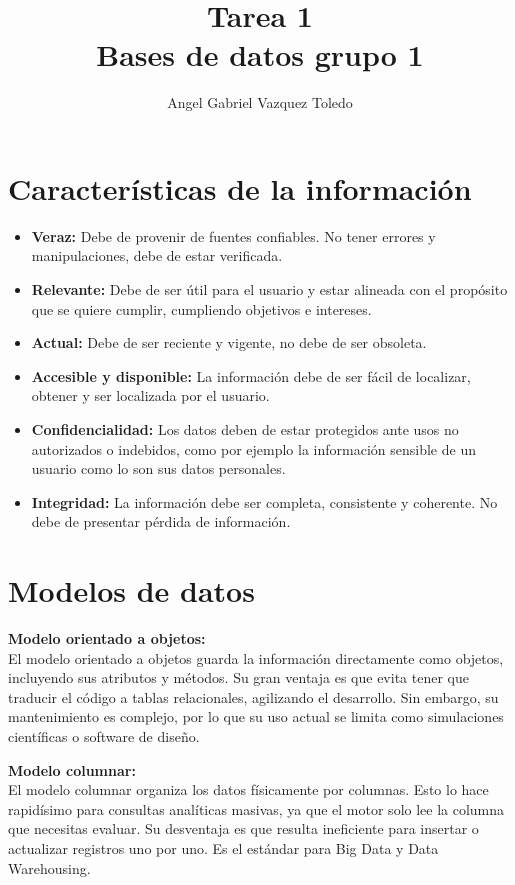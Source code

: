 \documentclass[12pt,a4paper]{article}
\title{\textbf{Tarea 1}\\ \large Bases de datos grupo 1}
\author{Angel Gabriel Vazquez Toledo}
\date{} %
\begin{document}
\maketitle

\section*{Características de la información}
\begin{itemize}
    \item \textbf{Veraz:} Debe de provenir de fuentes confiables. No tener errores y manipulaciones, debe de estar verificada.
    \item \textbf{Relevante:} Debe de ser útil para el usuario y estar alineada con el propósito que se quiere cumplir, cumpliendo objetivos e intereses.
    \item \textbf{Actual:} Debe de ser reciente y vigente, no debe de ser obsoleta.
    \item \textbf{Accesible y disponible:} La información debe de ser fácil de localizar, obtener y ser localizada por el usuario.
    \item \textbf{Confidencialidad:} Los datos deben de estar protegidos ante usos no autorizados o indebidos, como por ejemplo la información sensible de un usuario como lo son sus datos personales.
    \item \textbf{Integridad:} La información debe ser completa, consistente y coherente. No debe de presentar pérdida de información.
\end{itemize}

\section*{Modelos de datos}

\textbf{Modelo orientado a objetos:} \\
El modelo orientado a objetos guarda la información directamente como objetos, incluyendo sus atributos y métodos. Su gran ventaja es que evita tener que traducir el código a tablas relacionales, agilizando el desarrollo. Sin embargo, su mantenimiento es complejo, por lo que su uso actual se limita como simulaciones científicas o software de diseño.

\textbf{Modelo columnar:} \\
El modelo columnar organiza los datos físicamente por columnas. Esto lo hace rapidísimo para consultas analíticas masivas, ya que el motor solo lee la columna que necesitas evaluar. Su desventaja es que resulta ineficiente para insertar o actualizar registros uno por uno. Es el estándar para Big Data y Data Warehousing.
\end{document}
